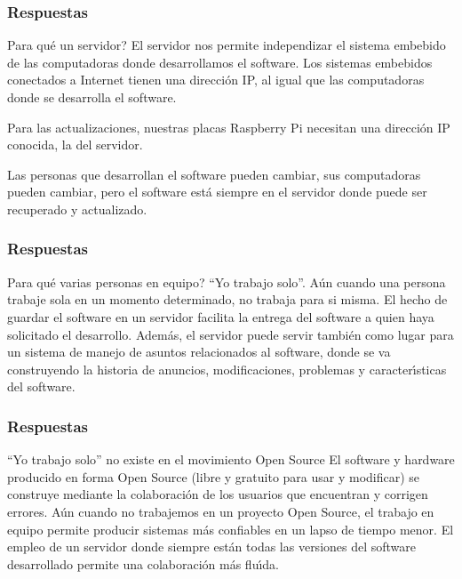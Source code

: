 \documentclass{beamer}
\begin{document}
\begin{frame}
\frametitle{Respuestas}

\begin{block}{\textquestiondown Para qu\'{e} un servidor?}
El servidor nos permite independizar el sistema embebido de las computadoras donde desarrollamos el software. 
Los sistemas embebidos conectados a Internet tienen una direcci\'{o}n IP, al igual que las computadoras donde se desarrolla el software. 

Para las actualizaciones, nuestras placas Raspberry Pi necesitan una direcci\'{o}n IP conocida, la del servidor.

Las personas que desarrollan el software pueden cambiar, sus computadoras pueden cambiar, pero el software est\'{a} siempre en el servidor donde puede ser recuperado y actualizado. 
\end{block}

\end{frame}

\begin{frame}
\frametitle{Respuestas}

\begin{block}{\textquestiondown Para qu\'{e} varias personas en equipo? ``Yo trabajo solo''.}
A\'{u}n cuando una persona trabaje sola en un momento determinado, no trabaja para si misma. El hecho de guardar el software en un servidor facilita la entrega del software a quien haya solicitado el desarrollo. Adem\'{a}s, el servidor puede servir tambi\'{e}n como lugar para un sistema de manejo de asuntos relacionados al software, donde se va construyendo la historia de anuncios, modificaciones, problemas y caracter\'{\i}sticas del software.
\end{block}
\end{frame}



\begin{frame}
\frametitle{Respuestas}

\begin{block}{``Yo trabajo solo'' no existe en el movimiento Open Source}
El software y hardware producido en forma Open Source (libre y gratuito para usar y modificar) se construye mediante la colaboraci\'{o}n de los usuarios que encuentran y corrigen errores. A\'{u}n cuando no trabajemos en un proyecto Open Source, el trabajo en equipo permite producir sistemas m\'{a}s confiables en un lapso de tiempo menor. El empleo de un servidor donde siempre est\'{a}n todas las versiones del software desarrollado permite una colaboraci\'{o}n m\'{a}s flu\'{\i}da.
\end{block}
\end{frame}
\end{document}
